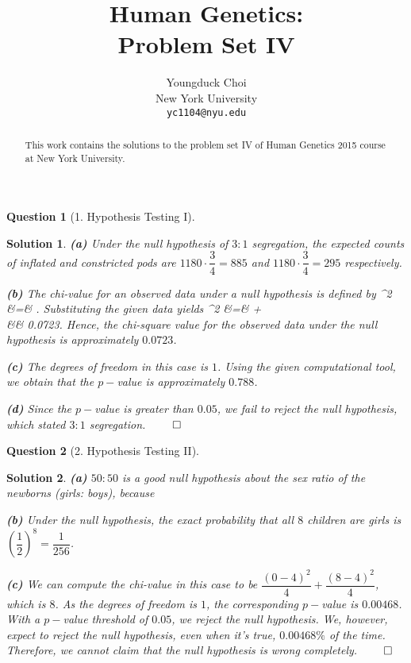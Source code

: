 \documentclass{article} %
\title{Human Genetics: \\
Problem Set IV}
\author{
Youngduck Choi \\
New York University\\
\texttt{yc1104@nyu.edu} \\
}
\def\eQb#1\eQe{\begin{eqnarray*}#1\end{eqnarray*}}
\theoremstyle{quest}
\newtheorem*{question}{Question}
\newtheorem*{solution}{Solution}
\begin{document}
\maketitle

\begin{abstract}
This work contains the solutions to the problem set IV
of Human Genetics 2015 course at New York University.
\end{abstract}

\bigskip

\begin{question}[1. Hypothesis Testing I]
\end{question}
\begin{solution}
\textbf{(a)} Under the null hypothesis of $3:1$ segregation, the expected counts of inflated
and constricted pods are $1180 \cdot \dfrac{3}{4} = 885$ and $1180 \cdot \dfrac{3}{4} = 295$
respectively.

\smallskip

\textbf{(b)} The chi-value for an observed data under a null hypothesis is defined by
\eQb
\chi^2 &=& \sum {}.
\eQe
Substituting the given data yields
\eQb
\chi^2 &=&  +  \\
&\approx& 0.0723. 
\eQe
Hence, the chi-square value for the observed data under the null hypothesis is
approximately $0.0723$. 

\smallskip

\textbf{(c)} The degrees of freedom in this case is $1$. Using the given computational tool,
we obtain that the $p-$value is approximately $0.788$. 

\smallskip

\textbf{(d)} Since the $p-$value is greater than $0.05$,
we fail to reject the null hypothesis, which stated $3:1$ segregation. $\qed$ 

\end{solution}

\bigskip

\begin{question}[2. Hypothesis Testing II]
\end{question}
\begin{solution}
\textbf{(a)} $50:50$ is a good null hypothesis about the sex ratio of the newborns (girls: boys),
because 

\smallskip

\textbf{(b)} Under the null hypothesis, the exact probability that all $8$ children are girls 
is $(\dfrac{1}{2})^8 = \dfrac{1}{256}$.

\smallskip

\textbf{(c)}
We can compute the chi-value in this case to be $\dfrac{(0-4)^2}{4} + \dfrac{(8-4)^2}{4}$, which
is $8$. As the degrees of freedom is $1$, the corresponding $p-$value is $0.00468$.
With a $p-$value threshold of $0.05$, we reject the null hypothesis. We, however, 
expect to reject the null hypothesis, even when it's 
true, $0.00468\%$ of the time. Therefore, we cannot claim that the null hypothesis is wrong completely.
$\qed$


\end{solution}
\end{document}
